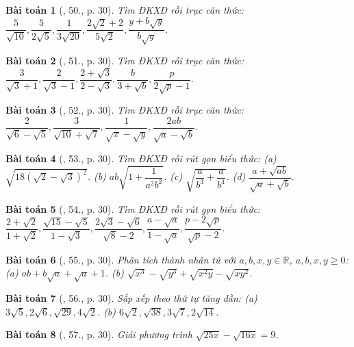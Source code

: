 \documentclass{article}
\newtheorem{baitoan}{Bài toán}
\begin{document}
\begin{baitoan}[\cite{SGK_Toan_9_tap_1}, 50., p. 30]
	Tìm ĐKXĐ rồi trục căn thức: $\dfrac{5}{\sqrt{10}},\dfrac{5}{2\sqrt{5}},\dfrac{1}{3\sqrt{20}},\dfrac{2\sqrt{2} + 2}{5\sqrt{2}},\dfrac{y + b\sqrt{y}}{b\sqrt{y}}$.
\end{baitoan}

\begin{baitoan}[\cite{SGK_Toan_9_tap_1}, 51., p. 30]
	Tìm ĐKXĐ rồi trục căn thức: $\dfrac{3}{\sqrt{3} + 1},\dfrac{2}{\sqrt{3} - 1},\dfrac{2 + \sqrt{3}}{2 - \sqrt{3}},\dfrac{b}{3 + \sqrt{b}},\dfrac{p}{2\sqrt{p} - 1}$.
\end{baitoan}

\begin{baitoan}[\cite{SGK_Toan_9_tap_1}, 52., p. 30]
	Tìm ĐKXĐ rồi trục căn thức: $\dfrac{2}{\sqrt{6} - \sqrt{5}},\dfrac{3}{\sqrt{10} + \sqrt{7}},\dfrac{1}{\sqrt{x} - \sqrt{y}},\dfrac{2ab}{\sqrt{a} - \sqrt{b}}$.
\end{baitoan}

\begin{baitoan}[\cite{SGK_Toan_9_tap_1}, 53., p. 30]
	Tìm ĐKXĐ rồi rút gọn biểu thức: (a) $\sqrt{18(\sqrt{2} - \sqrt{3})^2}$. (b) $ab\sqrt{1 + \dfrac{1}{a^2b^2}}$. (c) $\sqrt{\dfrac{a}{b^3} + \dfrac{a}{b^4}}$. (d) $\dfrac{a + \sqrt{ab}}{\sqrt{a} + \sqrt{b}}$.
\end{baitoan}

\begin{baitoan}[\cite{SGK_Toan_9_tap_1}, 54., p. 30]
	Tìm ĐKXĐ rồi rút gọn biểu thức: $\dfrac{2 + \sqrt{2}}{1 + \sqrt{2}},\dfrac{\sqrt{15} - \sqrt{5}}{1 - \sqrt{3}},\dfrac{2\sqrt{3} - \sqrt{6}}{\sqrt{8} - 2},\dfrac{a - \sqrt{a}}{1 - \sqrt{a}},\dfrac{p - 2\sqrt{p}}{\sqrt{p} - 2}$.
\end{baitoan}

\begin{baitoan}[\cite{SGK_Toan_9_tap_1}, 55., p. 30]
	Phân tích thành nhân tử với $a,b,x,y\in\mathbb{R}$, $a,b,x,y\ge0$: (a) $ab + b\sqrt{a} + \sqrt{a} + 1$. (b) $\sqrt{x^3} - \sqrt{y^3} + \sqrt{x^2y} - \sqrt{xy^2}$.
\end{baitoan}

\begin{baitoan}[\cite{SGK_Toan_9_tap_1}, 56., p. 30]
	Sắp xếp theo thứ tự tăng dần: (a) $3\sqrt{5},2\sqrt{6},\sqrt{29},4\sqrt{2}$. (b) $6\sqrt{2},\sqrt{38},3\sqrt{7},2\sqrt{14}$.
\end{baitoan}

\begin{baitoan}[\cite{SGK_Toan_9_tap_1}, 57., p. 30]
	Giải phương trình $\sqrt{25x} - \sqrt{16x} = 9$.
\end{baitoan}
\end{document}
